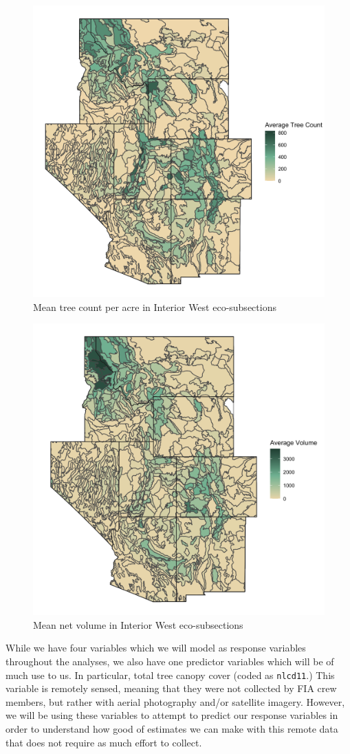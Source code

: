 \documentclass[12pt,twoside]{reedthesis}
\begin{document}
\begin{figure}

{\centering \includegraphics[width=0.65\linewidth]{figure/count} 

}

\caption{Mean tree count per acre in Interior West eco-subsections}\label{fig:unnamed-chunk-8}
\end{figure}
\begin{figure}

{\centering \includegraphics[width=0.65\linewidth]{figure/voln} 

}

\caption{Mean net volume in Interior West eco-subsections}\label{fig:unnamed-chunk-9}
\end{figure}
While we have four variables which we will model as response variables throughout the analyses, we also have one predictor variables which will be of much use to us. In particular, total tree canopy cover (coded as \texttt{nlcd11}.) This variable is remotely sensed, meaning that they were not collected by FIA crew members, but rather with aerial photography and/or satellite imagery. However, we will be using these variables to attempt to predict our response variables in order to understand how good of estimates we can make with this remote data that does not require as much effort to collect.
\end{document}
